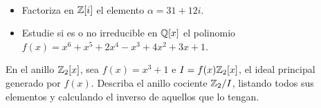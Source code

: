 \documentclass[12pt]{article}
\newcounter{ejercicio}[section] %
\newcounter{ejercicio}
\newcommand{\resetearcontador}{%
  \setcounter{ejercicio}{0} %
}
\begin{document}
    \begin{ejercicio}
        \ 
        \begin{itemize}
            \item Factoriza en $\mathbb{Z}[i]$ el elemento $\alpha = 31 + 12i$.
            \item Estudie si es o no irreducible en $\mathbb{Q}[x]$ el polinomio $f(x) = x^6 + x^5 + 2x^4 - x^3 + 4x^2 + 3x +1$.
        \end{itemize}
    \end{ejercicio}

    \begin{ejercicio}
        En el anillo $\mathbb{Z}_2[x]$, sea $f(x) = x^3 + 1$ e $I = f(x)\mathbb{Z}_2[x]$, el ideal principal generado por $f(x)$. Describa el anillo cociente $\mathbb{Z}_2/I$, listando todos sus elementos y calculando el inverso de aquellos que lo tengan.
    \end{ejercicio}

    \newpage
    \       %
    \newpage
    \resetearcontador
\end{document}
